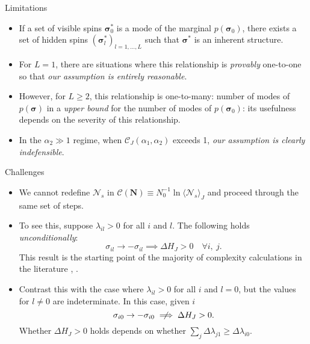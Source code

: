 \documentclass[8pt]{beamer}
\begin{document}
\begin{frame}[label={sec:orgf3b83eb}]{Limitations}
\begin{itemize}
\item If a set of visible spins \(\boldsymbol{\sigma}_{0}^{\ast}\) is a mode of the marginal \(p(\boldsymbol{\sigma}_{0})\), there exists a set of hidden spins \((\boldsymbol{\sigma}_{l}^{\ast})_{l=1,\ldots, L}\) such that \(\boldsymbol{\sigma}^{\ast}\) is an inherent structure.
\linebreak
\item For \(L = 1\), there are situations where this relationship is \emph{provably} one-to-one \cite{montufar2015mixture} so that \emph{our assumption is entirely reasonable}.
\linebreak
\item However, for \(L \geq 2\), this relationship is one-to-many: number of modes of \(p (\boldsymbol{\sigma})\) in a \emph{upper bound} for the number of modes of \(p(\boldsymbol{\sigma}_{0})\): its usefulness depends on the severity of this relationship.
\linebreak
\item In the \(\alpha_2 \gg 1\) regime, when \(\mathcal{C}_{J} (\alpha_{1}, \alpha_{2})\) exceeds 1, \emph{our assumption is clearly indefensible}.
\end{itemize}
\end{frame}

\begin{frame}[label={sec:org6ef07cd}]{Challenges}
\begin{itemize}
\item We cannot redefine \(\mathcal{N}_{s}\) in \(\mathcal{C} (\boldsymbol{N}) \equiv N_{0}^{-1} \ln \langle \mathcal{N}_{s} \rangle_{J}\) and proceed through the same set of steps.
\linebreak
\item To see this, suppose \(\lambda_{il} > 0\) for all \(i\) and \(l\). The following holds \emph{unconditionally}:
\[\sigma_{il} \to -\sigma_{il} \implies \Delta H_{J} > 0 \quad \forall i,~ j.\]
This result is the starting point of the majority of complexity calculations in the literature \cite{bray1981metastable}, \cite{tanaka1980analytic}.
\linebreak
\item Contrast this with the case where \(\lambda_{il} > 0\) for all \(i\) and \(l = 0\), but the values for \(l \neq 0\) are indeterminate. In this case, given \(i\)
\[\sigma_{i0} \to -\sigma_{i0} \centernot\implies \Delta H_J  > 0.\]
Whether \(\Delta H_J > 0\) holds depends on whether \(\sum_{j} \Delta \lambda_{j1} \geq \Delta \lambda_{i0}\).
\end{itemize}
\end{frame}
\end{document}
